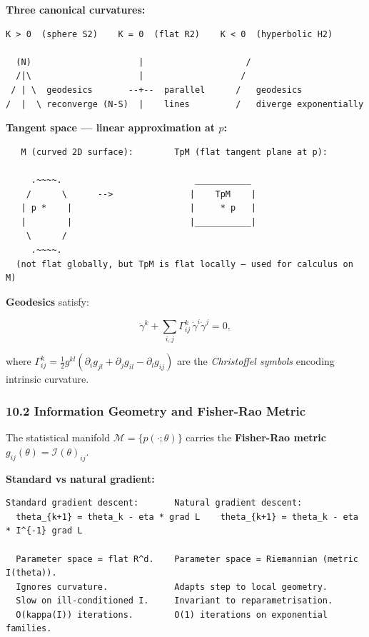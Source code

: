 \documentclass[11pt,a4paper]{article}
\begin{document}
\textbf{Three canonical curvatures:}

\begin{verbatim}
K > 0  (sphere S2)    K = 0  (flat R2)    K < 0  (hyperbolic H2)

  (N)                     |                    /
  /|\                     |                   /
 / | \  geodesics       --+--  parallel      /   geodesics
/  |  \ reconverge (N-S)  |    lines         /   diverge exponentially
\end{verbatim}

\textbf{Tangent space --- linear approximation at \(p\):}

\begin{verbatim}
   M (curved 2D surface):        TpM (flat tangent plane at p):

     .~~~~.                          ___________
    /      \      -->               |    TpM    |
   | p *    |                       |     * p   |
   |        |                       |___________|
    \      /
     .~~~~.
  (not flat globally, but TpM is flat locally — used for calculus on M)
\end{verbatim}

\textbf{Geodesics} satisfy:

\[\ddot\gamma^k + \sum_{i,j}\Gamma^k_{ij}\,\dot\gamma^i\dot\gamma^j = 0,\]

where \(\Gamma^k_{ij} = \tfrac12 g^{kl}(\partial_i g_{jl}+\partial_j g_{il}-\partial_l g_{ij})\) are the \emph{Christoffel symbols} encoding intrinsic curvature.

\subsubsection{10.2 Information Geometry and Fisher-Rao Metric}\label{information-geometry-and-fisher-rao-metric}

The statistical manifold \(\mathcal{M} = \{p(\cdot;\theta)\}\) carries the \textbf{Fisher-Rao metric} \(g_{ij}(\theta) = \mathcal{I}(\theta)_{ij}\).

\textbf{Standard vs natural gradient:}

\begin{verbatim}
Standard gradient descent:       Natural gradient descent:
  theta_{k+1} = theta_k - eta * grad L    theta_{k+1} = theta_k - eta * I^{-1} grad L

  Parameter space = flat R^d.    Parameter space = Riemannian (metric I(theta)).
  Ignores curvature.             Adapts step to local geometry.
  Slow on ill-conditioned I.     Invariant to reparametrisation.
  O(kappa(I)) iterations.        O(1) iterations on exponential families.
\end{verbatim}
\end{document}
